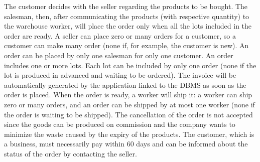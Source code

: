 The customer decides with the seller regarding the products to be bought. The salesman, then, after communicating the products (with respective quantity) to the warehouse worker, will place the order only when all the lots included in the order are ready. A seller can place zero or many orders for a customer, so a customer can make many order (none if, for example, the customer is new). An order can be placed by only one salesman for only one customer. An order includes one or more lots. Each lot can be included by only one order (none if the lot is produced in advanced and waiting to be ordered). The invoice will be automatically generated by the application linked to the DBMS as soon as the order is placed.
When the order is ready, a worker will ship it: a worker can ship zero or many orders, and an order can be shipped by at most one worker (none if the order is waiting to be shipped). The cancellation of the order is not accepted since the goods can be produced on commission and the company wants to minimize the waste caused by the expiry of the products. The customer, which is a business, must necessarily pay within 60 days and can be informed about the status of the order by contacting the seller.
